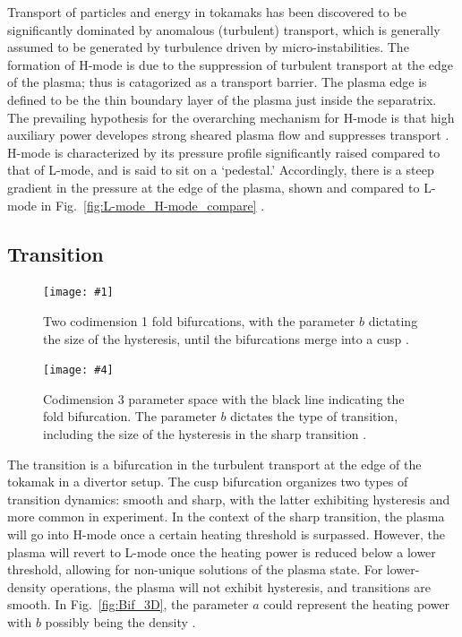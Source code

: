\documentclass[a4paper]{article}
\newcommand\TwoFig[6]{%
	\sbox\IBoxA{\texttt{[image: \#1]}}
	\sbox\IBoxB{\texttt{[image: \#4]}}%
	\ifdim\ht\IBoxA>\ht\IBoxB
		\setlength\IHeight{\ht\IBoxB}%
	\else\setlength\IHeight{\ht\IBoxA}\fi
	\begin{figure}[tb]
		\minipage[t]{0.45\textwidth}\centering
			\texttt{[image: \#1]}
			\caption{#2}\label{#3}
		\endminipage\hfill
		\minipage[t]{0.45\textwidth}\centering
			\texttt{[image: \#4]}
			\caption{#5}\label{#6}
		\endminipage
	\end{figure}%
}
\begin{document}
Transport of particles and energy in tokamaks has been discovered to be significantly dominated by anomalous (turbulent) transport, which is generally assumed to be generated by turbulence driven by micro-instabilities.
The formation of H-mode is due to the suppression of turbulent transport at the edge of the plasma; thus is catagorized as a transport barrier.
The plasma edge is defined to be the thin boundary layer of the plasma just inside the separatrix.
The prevailing hypothesis for the overarching mechanism for H-mode is that high auxiliary power developes strong sheared plasma flow and suppresses transport \cite{freidberg_plasma_2007}.
H-mode is characterized by its pressure profile significantly raised compared to that of L-mode, and is said to sit on a `pedestal.'
Accordingly, there is a steep gradient in the pressure at the edge of the plasma, shown and compared to L-mode in Fig.~\ref{fig:L-mode_H-mode_compare} \cite{weymiens_bifurcation_2014}.


\subsection{Transition}
\TwoFig{../../Graphics/Bif_3D.png}
	{Two codimension 1 fold bifurcations, with the parameter $b$ dictating the size of the hysteresis, until the bifurcations merge into a cusp \cite{weymiens_bifurcation_2014}.}
	{fig:Bif_3D}
	{../../Graphics/3_transitions_single_simple.png}
	{Codimension 3 parameter space with the black line indicating the fold bifurcation. The parameter $b$ dictates the type of transition, including the size of the hysteresis in the sharp transition \cite{weymiens_bifurcation_2014}.}
	{fig:Bif_types}

The transition is a bifurcation in the turbulent transport at the edge of the tokamak in a divertor setup.
The cusp bifurcation organizes two types of transition dynamics: smooth and sharp, with the latter exhibiting hysteresis and more common in experiment.
In the context of the sharp transition, the plasma will go into H-mode once a certain heating threshold is surpassed.
However, the plasma will revert to L-mode once the heating power is reduced below a lower threshold, allowing for non-unique solutions of the plasma state.
For lower-density operations, the plasma will not exhibit hysteresis, and transitions are smooth.
In Fig.~\ref{fig:Bif_3D}, the parameter $a$ could represent the heating power with $b$ possibly being the density \cite{weymiens_bifurcation_2014}.
\end{document}
